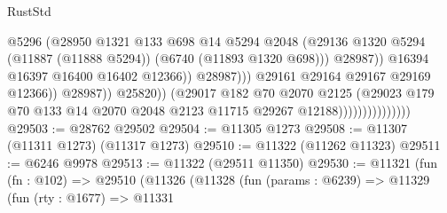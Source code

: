 \begin{lexlean}{RustStd}
\begin{coremodule}
                                                      @5296
                                                      (@28950
                                                        @1321
                                                        @133
                                                        @698
                                                        @14
                                                        @5294
                                                        @2048
                                                        (@29136
                                                          @1320
                                                          @5294
                                                          (@11887 (@11888 @5294))
                                                          (@6740 (@11893 @1320 @698)))
                                                        @28987))
                                                    @16394
                                                    @16397
                                                    @16400
                                                    @16402
                                                    @12366))
                                                @28987)))
                                          @29161
                                          @29164
                                          @29167
                                          @29169
                                          @12366))
                                      @28987))
                                  @25820))
                              (@29017
                                @182
                                @70
                                @2070
                                @2125
                                (@29023
                                  @179
                                  @70
                                  @133
                                  @14
                                  @2070
                                  @2048
                                  @2123
                                  @11715
                                  @29267
                                  @12188)))))))))))))))
@29503 := @28762 @29502
@29504 := @11305 @1273
@29508 := @11307 (@11311 @1273) (@11317 @1273)
@29510 := @11322 (@11262 @11323)
@29511 := @6246 @9978
@29513 := @11322 (@29511 @11350)
@29530 := @11321
    (fun (fn : @102) =>
    @29510
      (@11326
        (@11328
          (fun (params : @6239) =>
          @11329
            (fun (rty : @1677) =>
            @11331

\end{coremodule}
\end{lexlean}
